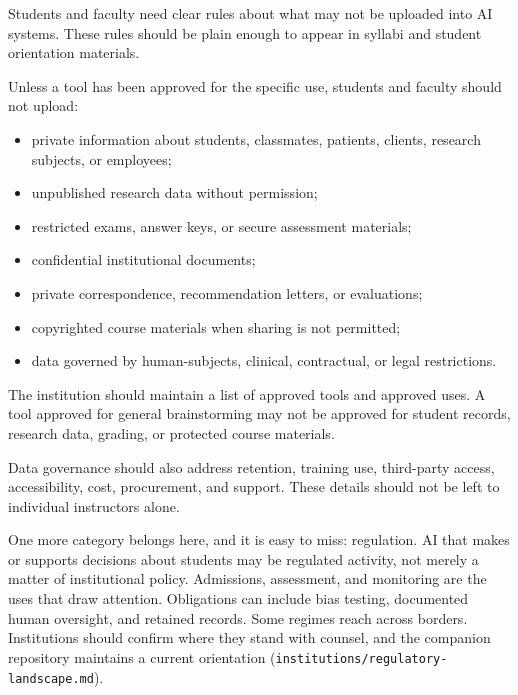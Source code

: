 \documentclass{SIAMbook2023}
\begin{document}
Students and faculty need clear rules about what may not be uploaded into AI systems. These rules should be plain enough to appear in syllabi and student orientation materials.

Unless a tool has been approved for the specific use, students and faculty should not upload:

\begin{itemize}
  \item private information about students, classmates, patients, clients, research subjects, or employees;
  \item unpublished research data without permission;
  \item restricted exams, answer keys, or secure assessment materials;
  \item confidential institutional documents;
  \item private correspondence, recommendation letters, or evaluations;
  \item copyrighted course materials when sharing is not permitted;
  \item data governed by human-subjects, clinical, contractual, or legal restrictions.
\end{itemize}

The institution should maintain a list of approved tools and approved uses. A tool approved for general brainstorming may not be approved for student records, research data, grading, or protected course materials.

Data governance should also address retention, training use, third-party access, accessibility, cost, procurement, and support. These details should not be left to individual instructors alone.

One more category belongs here, and it is easy to miss: regulation. AI that makes or supports decisions about students may be regulated activity, not merely a matter of institutional policy. Admissions, assessment, and monitoring are the uses that draw attention. Obligations can include bias testing, documented human oversight, and retained records. Some regimes reach across borders. Institutions should confirm where they stand with counsel, and the companion repository maintains a current orientation (\texttt{institutions/regulatory-landscape.md}).
\end{document}
